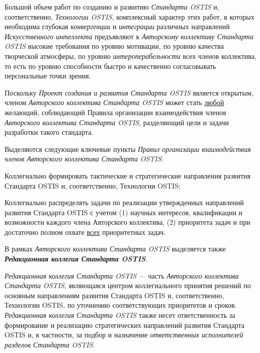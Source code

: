 Большой объем работ по созданию и развитию \textit{Стандарта OSTIS} и, соответственно, \textit{Технологии OSTIS}, комплексный характер этих работ, в которых необходима глубокая \textit{конвергенции} и \textit{интеграции} различных направлений \textit{Искусственного интеллекта} предъявляют к \textit{Авторскому коллективу Стандарта OSTIS}  высокие требования по уровню мотивации, по уровню качества творческой атмосферы, по уровню \textit{интероперабельности} всех членов коллектива, то есть по уровню способности быстро и качественно согласовывать персональные точки зрения.

Поскольку \textit{Проект создания и развития Стандарта OSTIS} является открытым, членом \textit{Авторского коллектива Стандарта OSTIS} может стать \uline{любой} желающий, соблюдающий Правила организации взаимодействия членов \textit{Авторского коллектива Стандарта OSTIS}, разделяющий цели и задачи разработки такого стандарта.

Выделяются следующие ключевые пункты \textit{Правил организации взаимодействия членов Авторского коллектива Стандарта OSTIS}:
\begin{textitemize}
	\item Коллегиально формировать тактические и стратегические направления развития Стандарта OSTIS и, соответственно, Технологии OSTIS;
	\item Коллегиально распределять задачи по реализации утвержденных направлений развития Стандарта OSTIS с учетом (1) научных интересов, квалификации и возможности каждого члена Авторского коллектива, (2) приоритета задач и при достаточно полном охвате \uline{всех} приоритетных задач.
\end{textitemize}

В рамках \textit{Авторского коллектива Стандарта OSTIS} выделяется также \textit{\textbf{Редакционная коллегия Стандарта OSTIS}}. 

\textit{Редакционная коллегия Стандарта OSTIS} --- часть \textit{Авторского коллектива Стандарта OSTIS}, являющаяся центром коллегиального принятия решений по основным направлениям развития Стандарта OSTIS и, соответственно, Технологии OSTIS, по уточнению соответствующих приоритетов и сроков. \textit{Редакционная коллегия Стандарта OSTIS} также несет ответственность за формирование и реализацию стратегических направлений развития Стандарта OSTIS и, в частности, за подбор и назначение \textit{ответственных исполнителей разделов Стандарта OSTIS}.

